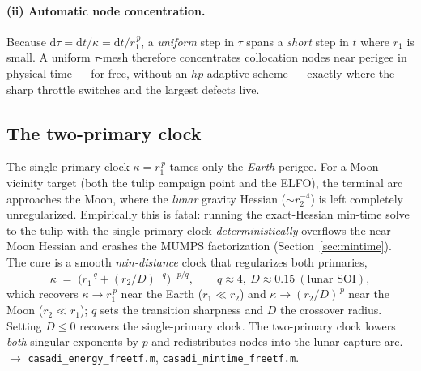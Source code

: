 \documentclass[11pt]{article}
\newcommand{\file}[1]{\texttt{\small #1}}
\newcommand{\rE}{r_1}
\newcommand{\rM}{r_2}
\begin{document}
\paragraph{(ii) Automatic node concentration.} Because
$\mathrm{d}\tau=\mathrm{d}t/\kappa=\mathrm{d}t/\rE^{\,p}$, a \emph{uniform} step
in $\tau$ spans a \emph{short} step in $t$ where $\rE$ is small. A uniform
$\tau$-mesh therefore concentrates collocation nodes near perigee in physical
time --- for free, without an $hp$-adaptive scheme --- exactly where the sharp
throttle switches and the largest defects live.

\subsection{The two-primary clock}\label{sec:sundman-two}
The single-primary clock $\kappa=\rE^{\,p}$ tames only the \emph{Earth} perigee.
For a Moon-vicinity target (both the tulip campaign point and the ELFO), the
terminal arc approaches the Moon, where the \emph{lunar} gravity Hessian
($\sim\rM^{-4}$) is left completely unregularized. Empirically this is fatal:
running the exact-Hessian min-time solve to the tulip with the single-primary
clock \emph{deterministically} overflows the near-Moon Hessian and crashes the
MUMPS factorization (Section~\ref{sec:mintime}). The cure is a smooth
\emph{min-distance} clock that regularizes both primaries,
\begin{equation}
  \kappa \;=\; \big(\rE^{-q} + (\rM/D)^{-q}\big)^{-p/q},
  \qquad q\approx4,\ D\approx0.15\ (\text{lunar SOI}),
  \label{eq:twoclock}
\end{equation}
which recovers $\kappa\to\rE^{\,p}$ near the Earth ($\rE\ll\rM$) and
$\kappa\to(\rM/D)^{\,p}$ near the Moon ($\rM\ll\rE$); $q$ sets the transition
sharpness and $D$ the crossover radius. Setting $D\le0$ recovers the
single-primary clock. The two-primary clock lowers \emph{both} singular
exponents by $p$ and redistributes nodes into the lunar-capture arc.
$\rightarrow$ \file{casadi\_energy\_freetf.m}, \file{casadi\_mintime\_freetf.m}.
\end{document}

